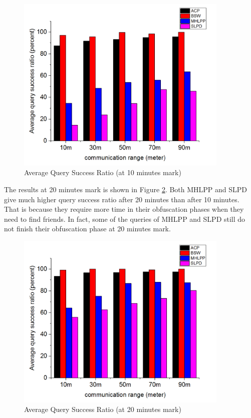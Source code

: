 \begin{figure} [htbp]
\centering 
\includegraphics[width=4.0in]{olgraph/QsrCr.png}
\caption{Average Query Success Ratio (at 10 minutes mark)} 
\label{fig:AverageQuerySuccessRatio10} %
\end{figure}

The results at 20 minutes mark is shown in Figure \ref{fig:AverageQuerySuccessRatio20}. Both MHLPP and SLPD give much higher query success ratio after 20 minutes than after 10 minutes. That is because they require more time in their obfuscation phases when they need to find friends. In fact, some of the queries of MHLPP and SLPD still do not finish their obfuscation phase at 20 minutes mark.

\begin{figure} [H]
\centering 
\includegraphics[width=4.0in]{olgraph/QsrCr20.png}
\caption{Average Query Success Ratio (at 20 minutes mark)} 
\label{fig:AverageQuerySuccessRatio20} %
\end{figure}

